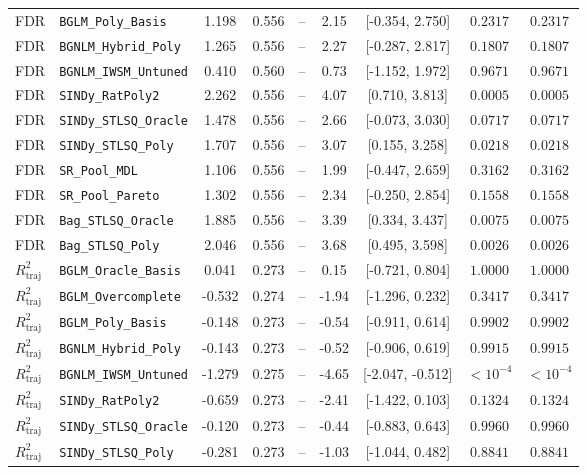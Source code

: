 \begin{table}[t]
\begin{tabular}{llccccccc}
FDR & \texttt{BGLM\_Poly\_Basis} & 1.198 & 0.556 & -- & 2.15 & [-0.354, 2.750] & $0.2317$ & $0.2317$ \\
FDR & \texttt{BGNLM\_Hybrid\_Poly} & 1.265 & 0.556 & -- & 2.27 & [-0.287, 2.817] & $0.1807$ & $0.1807$ \\
FDR & \texttt{BGNLM\_IWSM\_Untuned} & 0.410 & 0.560 & -- & 0.73 & [-1.152, 1.972] & $0.9671$ & $0.9671$ \\
FDR & \texttt{SINDy\_RatPoly2} & 2.262 & 0.556 & -- & 4.07 & [0.710, 3.813] & $0.0005$ & $0.0005$ \\
FDR & \texttt{SINDy\_STLSQ\_Oracle} & 1.478 & 0.556 & -- & 2.66 & [-0.073, 3.030] & $0.0717$ & $0.0717$ \\
FDR & \texttt{SINDy\_STLSQ\_Poly} & 1.707 & 0.556 & -- & 3.07 & [0.155, 3.258] & $0.0218$ & $0.0218$ \\
FDR & \texttt{SR\_Pool\_MDL} & 1.106 & 0.556 & -- & 1.99 & [-0.447, 2.659] & $0.3162$ & $0.3162$ \\
FDR & \texttt{SR\_Pool\_Pareto} & 1.302 & 0.556 & -- & 2.34 & [-0.250, 2.854] & $0.1558$ & $0.1558$ \\
FDR & \texttt{Bag\_STLSQ\_Oracle} & 1.885 & 0.556 & -- & 3.39 & [0.334, 3.437] & $0.0075$ & $0.0075$ \\
FDR & \texttt{Bag\_STLSQ\_Poly} & 2.046 & 0.556 & -- & 3.68 & [0.495, 3.598] & $0.0026$ & $0.0026$ \\
\midrule
$R^2_{\text{traj}}$ & \texttt{BGLM\_Oracle\_Basis} & 0.041 & 0.273 & -- & 0.15 & [-0.721, 0.804] & $1.0000$ & $1.0000$ \\
$R^2_{\text{traj}}$ & \texttt{BGLM\_Overcomplete} & -0.532 & 0.274 & -- & -1.94 & [-1.296, 0.232] & $0.3417$ & $0.3417$ \\
$R^2_{\text{traj}}$ & \texttt{BGLM\_Poly\_Basis} & -0.148 & 0.273 & -- & -0.54 & [-0.911, 0.614] & $0.9902$ & $0.9902$ \\
$R^2_{\text{traj}}$ & \texttt{BGNLM\_Hybrid\_Poly} & -0.143 & 0.273 & -- & -0.52 & [-0.906, 0.619] & $0.9915$ & $0.9915$ \\
$R^2_{\text{traj}}$ & \texttt{BGNLM\_IWSM\_Untuned} & -1.279 & 0.275 & -- & -4.65 & [-2.047, -0.512] & $< 10^{-4}$ & $< 10^{-4}$ \\
$R^2_{\text{traj}}$ & \texttt{SINDy\_RatPoly2} & -0.659 & 0.273 & -- & -2.41 & [-1.422, 0.103] & $0.1324$ & $0.1324$ \\
$R^2_{\text{traj}}$ & \texttt{SINDy\_STLSQ\_Oracle} & -0.120 & 0.273 & -- & -0.44 & [-0.883, 0.643] & $0.9960$ & $0.9960$ \\
$R^2_{\text{traj}}$ & \texttt{SINDy\_STLSQ\_Poly} & -0.281 & 0.273 & -- & -1.03 & [-1.044, 0.482] & $0.8841$ & $0.8841$ \\

\end{tabular}
\end{table}
